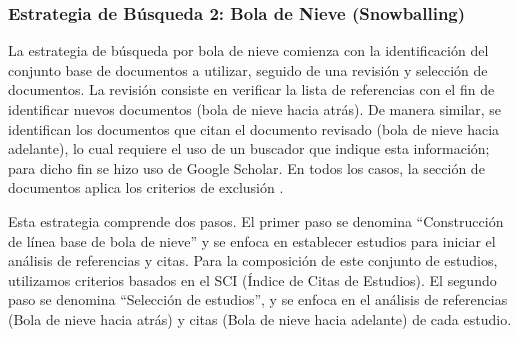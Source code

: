 \subsubsection{Estrategia de Búsqueda 2: Bola de Nieve (Snowballing)}

\newcommand{\csiSelected}{24} %
\newcommand{\newSnowballStudies}{3} %
\newcommand{\firstBackwardSnowballStudies}{3} %
\newcommand{\firstForwardSnowballStudies}{4} %
\newcommand{\secondBackwardSnowballStudies}{3} %
\newcommand{\secondForwardSnowballStudies}{5} %

\newcommand{\firstSnowballIterationStudies}{\fpeval{\firstBackwardSnowballStudies+\firstForwardSnowballStudies}}
\newcommand{\secondSnowballIterationStudies}{\fpeval{\secondBackwardSnowballStudies+\secondForwardSnowballStudies}}

\newcommand{\snowballNewStudies}{\fpeval{\firstSnowballIterationStudies+\secondSnowballIterationStudies}}

La estrategia de búsqueda por bola de nieve comienza con la identificación del conjunto base de documentos a utilizar, seguido de una revisión y selección de documentos. La revisión consiste en verificar la lista de referencias con el fin de identificar nuevos documentos (bola de nieve hacia atrás). De manera similar, se identifican los documentos que citan el documento revisado (bola de nieve hacia adelante), lo cual requiere el uso de un buscador que indique esta información; para dicho fin se hizo uso de Google Scholar. En todos los casos, la sección de documentos aplica los criterios de exclusión \cite{Wohlin-01}.

Esta estrategia comprende dos pasos. El primer paso se denomina ``Construcción de línea base de bola de nieve'' y se enfoca en establecer estudios para iniciar el análisis de referencias y citas. Para la composición de este conjunto de estudios, utilizamos criterios basados en el SCI (Índice de Citas de Estudios). El segundo paso se denomina ``Selección de estudios'', y se enfoca en el análisis de referencias (Bola de nieve hacia atrás) y citas (Bola de nieve hacia adelante) de cada estudio.



